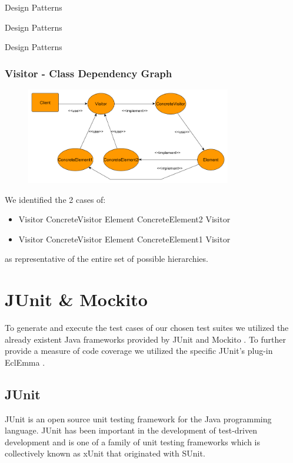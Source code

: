 \documentclass{beamer}
\begin{document}
\begin{section}{Design Patterns}
\begin{subsection}{Design Patterns}
\begin{frame}
	\end{frame}
\end{subsection}

\begin{subsection}{Design Patterns}
	\begin{frame}
		\frametitle{Visitor - Class Dependency Graph}
		
\begin{figure}[!h]
	\centering
	\includegraphics[width=0.8\textwidth]{./Visitor/ClassDependencyGraph.png}
	\label{Videpengraph}
\end{figure}
We identified the 2 cases of:
\begin{itemize}
	\item Visitor ConcreteVisitor Element ConcreteElement2 Visitor
	\item Visitor ConcreteVisitor Element ConcreteElement1 Visitor	
\end{itemize}
as representative of the entire set of possible hierarchies.
	\end{frame}
\end{subsection}
\end{section}


\section{JUnit \& Mockito}
To generate and execute the test cases of our chosen test suites we utilized the already existent Java frameworks provided by JUnit \cite{1} and Mockito \cite{2}. To further provide a measure of code coverage we utilized the specific JUnit's plug-in EclEmma \cite{3}.

\subsection{JUnit}

JUnit is an open source unit testing framework for the Java programming language. JUnit has been important in the development of test-driven development and is one of a family of unit testing frameworks which is collectively known as xUnit that originated with SUnit.
\end{document}
